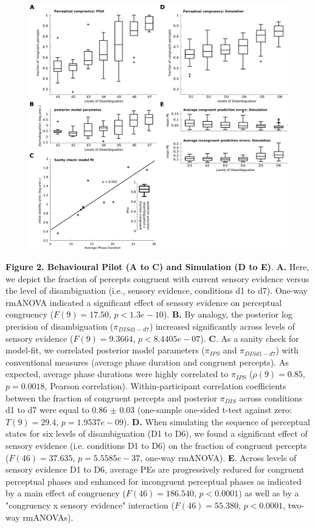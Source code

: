 \documentclass[12pt]{article}
\begin{document}
\clearpage
\begin{figure}[h]
\begin{center}
\includegraphics[width=16cm]{Figure_2.png}
\end{center}
\end{figure}

\textbf{Figure 2. Behavioural Pilot (A to C) and Simulation (D to E)}. \textbf{A.} Here, we depict the fraction of percepts congruent with current sensory evidence versus the level of disambiguation (i.e., sensory evidence, conditions d1 to d7). One-way rmANOVA indicated a significant effect of sensory evidence on perceptual congruency ($F(9) = 17.50$, $p < 1.3e-10$). \textbf{B.} By analogy, the posterior log precision of disambiguation ($\pi_{DIS d1-d7}$) increased significantly across levels of sensory evidence ($F(9) = 9.3664$, $p < 8.4405e-07$). \textbf{C}. As a sanity check for model-fit, we correlated posterior model parameters ($\pi_{IPS}$ and $\pi_{DIS d1-d7}$) with conventional measures (average phase duration and congruent percepts). As expected, average phase durations were highly correlated to $\pi_{IPS}$ ($\rho(9) = 0.85$, $p = 0.0018$, Pearson correlation). Within-participant correlation coefficients between the fraction of congruent percepts and posterior $\pi_{DIS}$ across conditions d1 to d7 were equal to 0.86 $\pm$ 0.03 (one-sample one-sided t-test against zero: $T(9) = 29.4$, $p = 1.9537e-09$). \textbf{D.} When simulating the sequence of perceptual states for six levels of disambiguation (D1 to D6), we found a significant effect of sensory evidence (i.e. conditions D1 to D6) on the fraction of congruent percepts ($F(46) = 37.635$, $p = 5.5585e-37$, one-way rmANOVA). \textbf{E}. Across levels of sensory evidence D1 to D6, average PEs are progressively reduced for congruent perceptual phases and enhanced for incongruent perceptual phases as indicated by a main effect of congruency ($F(46) = 186.540$, $p < 0.0001$) as well as by a "congruency x sensory evidence" interaction ($F(46) = 55.380$, $p < 0.0001$, two-way rmANOVAs).
\end{document}
